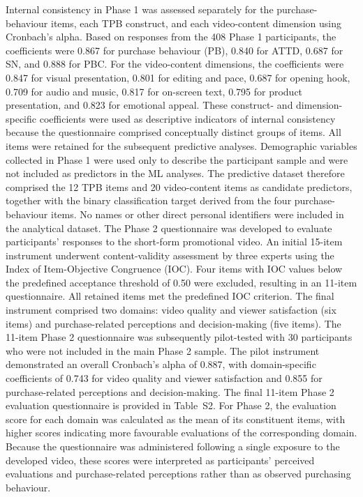 \documentclass[jtaer,article,submit,moreauthors]{Definitions/mdpi}
\begin{document}
Internal consistency in Phase 1 was assessed separately for the purchase-behaviour items, each TPB construct, and each video-content dimension using Cronbach's alpha. Based on responses from the 408 Phase 1 participants, the coefficients were 0.867 for purchase behaviour (PB), 0.840 for ATTD, 0.687 for SN, and 0.888 for PBC. For the video-content dimensions, the coefficients were 0.847 for visual presentation, 0.801 for editing and pace, 0.687 for opening hook, 0.709 for audio and music, 0.817 for on-screen text, 0.795 for product presentation, and 0.823 for emotional appeal. These construct- and dimension-specific coefficients were used as descriptive indicators of internal consistency because the questionnaire comprised conceptually distinct groups of items. All items were retained for the subsequent predictive analyses.
Demographic variables collected in Phase 1 were used only to describe the participant sample and were not included as predictors in the ML analyses. The predictive dataset therefore comprised the 12 TPB items and 20 video-content items as candidate predictors, together with the binary classification target derived from the four purchase-behaviour items. No names or other direct personal identifiers were included in the analytical dataset.
The Phase 2 questionnaire was developed to evaluate participants' responses to the short-form promotional video. An initial 15-item instrument underwent content-validity assessment by three experts using the Index of Item-Objective Congruence (IOC). Four items with IOC values below the predefined acceptance threshold of 0.50 were excluded, resulting in an 11-item questionnaire. All retained items met the predefined IOC criterion. The final instrument comprised two domains: video quality and viewer satisfaction (six items) and purchase-related perceptions and decision-making (five items).
The 11-item Phase 2 questionnaire was subsequently pilot-tested with 30 participants who were not included in the main Phase 2 sample. The pilot instrument demonstrated an overall Cronbach's alpha of 0.887, with domain-specific coefficients of 0.743 for video quality and viewer satisfaction and 0.855 for purchase-related perceptions and decision-making. The final 11-item Phase 2 evaluation questionnaire is provided in Table~S2.
For Phase 2, the evaluation score for each domain was calculated as the mean of its constituent items, with higher scores indicating more favourable evaluations of the corresponding domain. Because the questionnaire was administered following a single exposure to the developed video, these scores were interpreted as participants' perceived evaluations and purchase-related perceptions rather than as observed purchasing behaviour. 
\end{document}
